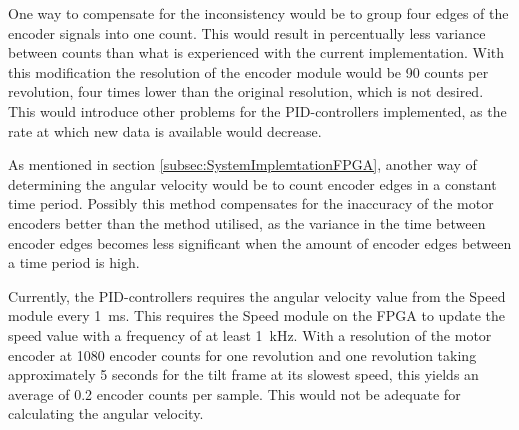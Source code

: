 \documentclass[../../main.tex]{subfiles}
\begin{document}
One way to compensate for the inconsistency would be to group four edges of the encoder signals into one count. This would result in percentually less variance between counts than what is experienced with the current implementation. With this modification the resolution of the encoder module would be 90 counts per revolution, four times lower than the original resolution, which is not desired. This would introduce other problems for the PID-controllers implemented, as the rate at which new data is available would decrease.


As mentioned in section \ref{subsec:SystemImplemtationFPGA}, another way of determining the angular velocity would be to count encoder edges in a constant time period. Possibly this method compensates for the inaccuracy of the motor encoders better than the method utilised, as the variance in the time between encoder edges becomes less significant when the amount of encoder edges between a time period is high. 

Currently, the PID-controllers requires the angular velocity value from the Speed module every \SI{1}{\milli \second}. This requires the Speed module on the FPGA to update the speed value with a frequency of at least \SI{1}{\kilo\hertz}. With a resolution of the motor encoder at 1080 encoder counts for one revolution and one revolution taking approximately 5 seconds for the tilt frame at its slowest speed, this yields an average of 0.2 encoder counts per sample. This would not be adequate for calculating the angular velocity. 

\end{document}
